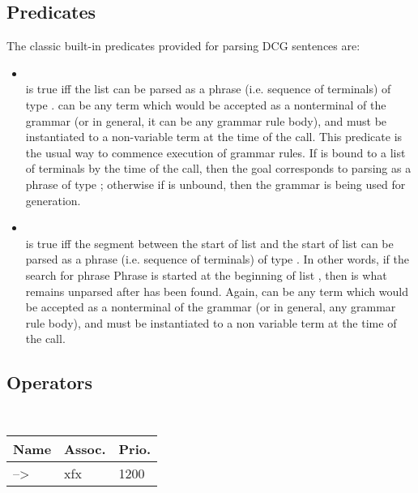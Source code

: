 \subsection{Predicates}

\noindent The classic built-in predicates provided for parsing DCG
sentences are:

\begin{itemize}
%
\item {}\\
\noindent{} is true iff the list 
can be parsed as a phrase (i.e. sequence of terminals) of type
.
%
 can be any term which would be accepted as a
nonterminal of the grammar (or in general, it can be any grammar
rule body), and must be instantiated to a non-variable term at the
time of the call.
%
This predicate is the usual way to commence execution of grammar
rules.
%
If  is bound to a list of terminals by the time of the
call, then the goal corresponds to parsing  as a phrase
of type ; otherwise if  is unbound, then the
grammar is being used for generation.\\
%
%
%
\item {}\\
\noindent{} is true iff the segment
between the start of list  and the start of list 
can be parsed as a phrase (i.e. sequence of terminals) of type
.
%
In other words, if the search for phrase Phrase is started at the
beginning of list , then  is what remains
unparsed after  has been found.
%
Again,  can be any term which would be accepted as a
nonterminal of the grammar (or in general, any grammar rule body),
and must be instantiated to a non variable term at the time
of the call.\\
%

\end{itemize}

\subsection{Operators}
\mbox{} %
\begin{table}[!h]
    \begin{center}{\small\tt
    \begin{tabular}{p{2cm}|p{1cm}|p{1cm}}\hline\hline
    Name & Assoc. & Prio. \\ \hline
    --> & xfx & 1200\\
    \hline\hline
    \end{tabular}
    }\end{center}
\end{table}

